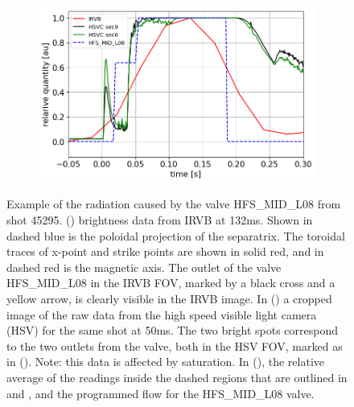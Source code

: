 \begin{figure}[!ht]
\begin{subfigure}{0.48\linewidth}
        \vspace*{-6mm}
        {\color{white}\caption{\phantom{ }}\label{fig:MAST-U_HFS_MID_L08_2}}
     \end{subfigure}
     \begin{subfigure}{0.6\linewidth}
        \vspace*{2mm}
        \centering
        \includegraphics[width=\textwidth,trim={5 0 0 0},clip]{Chapters/chapter2/figs/45295_for_paper2.png}
        \vspace*{-6mm}
        {\color{white}\caption{\phantom{ }}\label{fig:MAST-U_HFS_MID_L08_3}}
     \end{subfigure}
        \vspace*{+5mm}
        \caption{Example of the radiation caused by the valve HFS\_MID\_L08 from shot 45295. () brightness data from IRVB at 132ms. Shown in dashed blue is the poloidal projection of the separatrix. The toroidal traces of x-point and strike points are shown in solid red, and in dashed red is the magnetic axis. The outlet of the valve HFS\_MID\_L08 in the IRVB FOV, marked by a black cross and a yellow arrow, is clearly visible in the IRVB image. In () a cropped image of the raw data from the high speed visible light camera (HSV) for the same shot at 50ms. The two bright spots correspond to the two outlets from the valve, both in the HSV FOV, marked as in (). Note: this data is affected by saturation. In (), the relative average of the readings inside the dashed regions that are outlined in  and , and the programmed flow for the HFS\_MID\_L08 valve.}
        \label{fig:MAST-U_HFS_MID_L08}
\end{figure}

